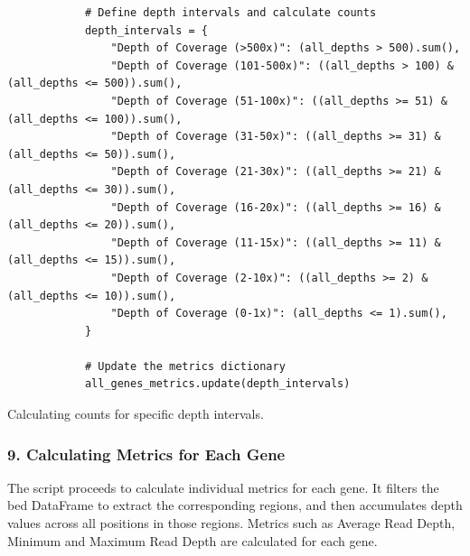 \begin{longlisting}
\begin{verbatim}
            # Define depth intervals and calculate counts
            depth_intervals = {
                "Depth of Coverage (>500x)": (all_depths > 500).sum(),
                "Depth of Coverage (101-500x)": ((all_depths > 100) & (all_depths <= 500)).sum(),
                "Depth of Coverage (51-100x)": ((all_depths >= 51) & (all_depths <= 100)).sum(),
                "Depth of Coverage (31-50x)": ((all_depths >= 31) & (all_depths <= 50)).sum(),
                "Depth of Coverage (21-30x)": ((all_depths >= 21) & (all_depths <= 30)).sum(),
                "Depth of Coverage (16-20x)": ((all_depths >= 16) & (all_depths <= 20)).sum(),
                "Depth of Coverage (11-15x)": ((all_depths >= 11) & (all_depths <= 15)).sum(),
                "Depth of Coverage (2-10x)": ((all_depths >= 2) & (all_depths <= 10)).sum(),
                "Depth of Coverage (0-1x)": (all_depths <= 1).sum(),
            }

            # Update the metrics dictionary
            all_genes_metrics.update(depth_intervals)
\end{verbatim}
\caption{Calculating counts for specific depth intervals.}
\label{lbl:metrics_intervals}
\end{longlisting}

\subsubsection{\textbf{9. Calculating Metrics for Each Gene}}

The script proceeds to calculate individual metrics for each gene. It filters the \ac{bed} DataFrame to extract the corresponding regions, and then accumulates depth values across all positions in those regions. Metrics such as Average Read Depth, Minimum and Maximum Read Depth are calculated for each gene.

